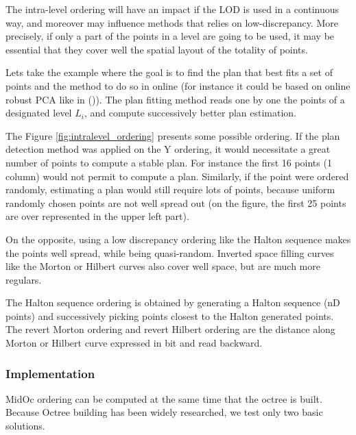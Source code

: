 		
		The intra-level ordering will have an impact if the LOD is used in a continuous way,
		and moreover may influence methods that relies on low-discrepancy.
		More precisely, if only a part of the points in a level are going to be used,
		it may be essential that they cover well the spatial layout of the totality of points.
		
		Lets take the example where the goal is to find the plan that best fits a set of points
		and the method to do so in online (for instance it could be based on online robust PCA like in (\cite{Feng2013})).
		The plan fitting method reads one by one the points of a designated level $L_i$, and compute successively better plan estimation.
		
		The Figure \ref{fig:intralevel_ordering} presents some possible ordering. 
		If the plan detection method was applied on the Y ordering, it would necessitate a great number of points to compute a stable plan. For instance the first 16 points (1 column) would not permit to compute a plan.
		Similarly, if the point were ordered randomly, estimating a plan would still require lots of points, because uniform randomly chosen points are not well spread out (on the figure, the first 25 points are over represented in the upper left part).
		
		On the opposite, using a low discrepancy ordering like the Halton sequence makes the points well spread, while being quasi-random.
		Inverted space filling curves like the Morton or Hilbert curves also cover well space, but are much more regulars.
		
		The Halton sequence ordering is obtained by generating a Halton sequence (nD points) and successively picking points closest to the Halton generated points.
		The revert Morton ordering and revert Hilbert ordering are the distance along Morton or Hilbert curve expressed in bit and read backward.
		
	
					
					
		\subsubsection{Implementation}
			MidOc ordering can be computed at the same time that the octree is built. Because Octree building has been widely researched, we test only two basic solutions.
			
